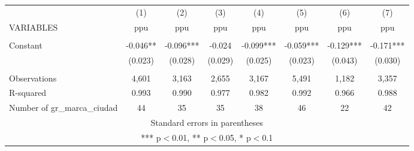 \begin{tabular}{lccccccc} \hline
 & (1) & (2) & (3) & (4) & (5) & (6) & (7) \\
VARIABLES & ppu & ppu & ppu & ppu & ppu & ppu & ppu \\ \hline
 &  &  &  &  &  &  &  \\
Constant & -0.046** & -0.096*** & -0.024 & -0.099*** & -0.059*** & -0.129*** & -0.171*** \\
 & (0.023) & (0.028) & (0.029) & (0.025) & (0.023) & (0.043) & (0.030) \\
 &  &  &  &  &  &  &  \\
Observations & 4,601 & 3,163 & 2,655 & 3,167 & 5,491 & 1,182 & 3,357 \\
R-squared & 0.993 & 0.990 & 0.977 & 0.982 & 0.992 & 0.966 & 0.988 \\
 Number of gr\_marca\_ciudad & 44 & 35 & 35 & 38 & 46 & 22 & 42 \\ \hline
\multicolumn{8}{c}{ Standard errors in parentheses} \\
\multicolumn{8}{c}{ *** p$<$0.01, ** p$<$0.05, * p$<$0.1} \\
\end{tabular}
